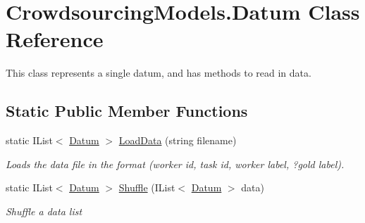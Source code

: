 \hypertarget{class_crowdsourcing_models_1_1_datum}{}\section{Crowdsourcing\+Models.\+Datum Class Reference}
\label{class_crowdsourcing_models_1_1_datum}


This class represents a single datum, and has methods to read in data.  


\subsection*{Static Public Member Functions}
\begin{DoxyCompactItemize}
\item 
static I\+List$<$ \hyperlink{class_crowdsourcing_models_1_1_datum}{Datum} $>$ \hyperlink{class_crowdsourcing_models_1_1_datum_a3ae3b8439f5b675ff7970cb18f216138}{Load\+Data} (string filename)
\begin{DoxyCompactList}\small\item\em Loads the data file in the format (worker id, task id, worker label, ?gold label). \end{DoxyCompactList}\item 
static I\+List$<$ \hyperlink{class_crowdsourcing_models_1_1_datum}{Datum} $>$ \hyperlink{class_crowdsourcing_models_1_1_datum_a3dcd604b51bd0ed8165e83d23cb752a6}{Shuffle} (I\+List$<$ \hyperlink{class_crowdsourcing_models_1_1_datum}{Datum} $>$ data)
\begin{DoxyCompactList}\small\item\em Shuffle a data list \end{DoxyCompactList}\end{DoxyCompactItemize}
